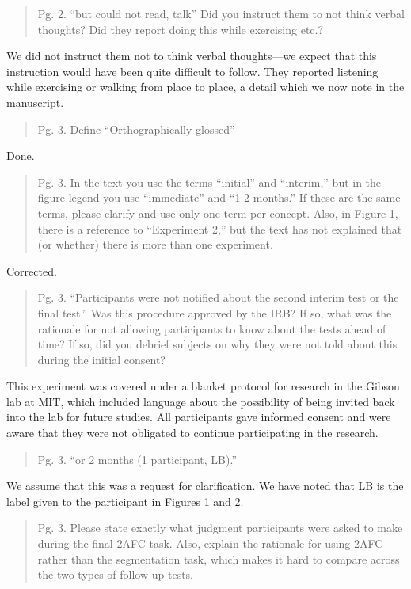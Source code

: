 \documentclass[12pt]{letter}
\begin{document}
\begin{quote}
Pg. 2. ``but could not read, talk'' Did you instruct them to not think verbal thoughts? Did they report doing this while exercising etc.?
\end{quote}

We did not instruct them not to think verbal thoughts---we expect that this instruction would have been quite difficult to follow. They reported listening while exercising or walking from place to place, a detail which we now note in the manuscript. 

\begin{quote}
Pg. 3. Define ``Orthographically glossed''
\end{quote}

Done. 

\begin{quote}
Pg. 3. In the text you use the terms ``initial'' and ``interim,'' but in the figure legend you use ``immediate'' and ``1-2 months.'' If these are the same terms, please clarify and use only one term per concept. Also, in Figure 1, there is a reference to ``Experiment 2,'' but the text has not explained that (or whether) there is more than one experiment.
\end{quote}

Corrected.

\begin{quote}
Pg. 3. ``Participants were not notified about the second interim test or the final test.'' Was this procedure approved by the IRB? If so, what was the rationale for not allowing participants to know about the tests ahead of time? If so, did you debrief subjects on why they were not told about this during the initial consent? 
\end{quote}

This experiment was covered under a blanket protocol for research in the Gibson lab at MIT, which included language about the possibility of being invited back into the lab for future studies. All participants gave informed consent and were aware that they were not obligated to continue participating in the research. 

\begin{quote}
Pg. 3. ``or 2 months (1 participant, LB).''
\end{quote}

We assume that this was a request for clarification. We have noted that LB is the label given to the participant in Figures 1 and 2.

\begin{quote}
Pg. 3. Please state exactly what judgment participants were asked to make during the final 2AFC task. Also, explain the rationale for using 2AFC rather than the segmentation task, which makes it hard to compare across the two types of follow-up tests.
\end{quote}
\end{document}
